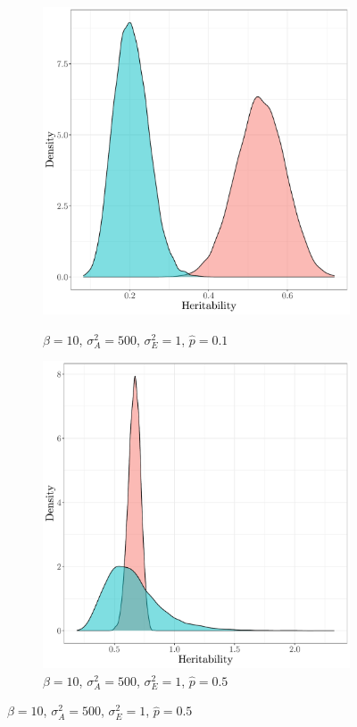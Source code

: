 \begin{figure}
\begin{subfigure}{0.49\textwidth}
    \label{fig:fixedeffects probit vs gaussian:lVAhP}
    \end{subfigure}
    \begin{subfigure}{0.49\textwidth}
    \caption{$\beta=10$, $\sigma^2_A=500$, $\sigma^2_E=1$, $\hat p=0.1$}
    \includegraphics[width=\textwidth]{figures/fixedeffects_gaussian_probit_sA500_p_1.pdf}
    \label{fig:fixedeffects probit vs gaussian:hVAlP}
    \end{subfigure}
    \begin{subfigure}{0.49\textwidth}
    \caption{$\beta=10$, $\sigma^2_A=500$, $\sigma^2_E=1$, $\hat p=0.5$}
    \includegraphics[width=\textwidth]{figures/fixedeffects_gaussian_probit_sA500_p_5.pdf}

\end{subfigure}
\end{figure}
